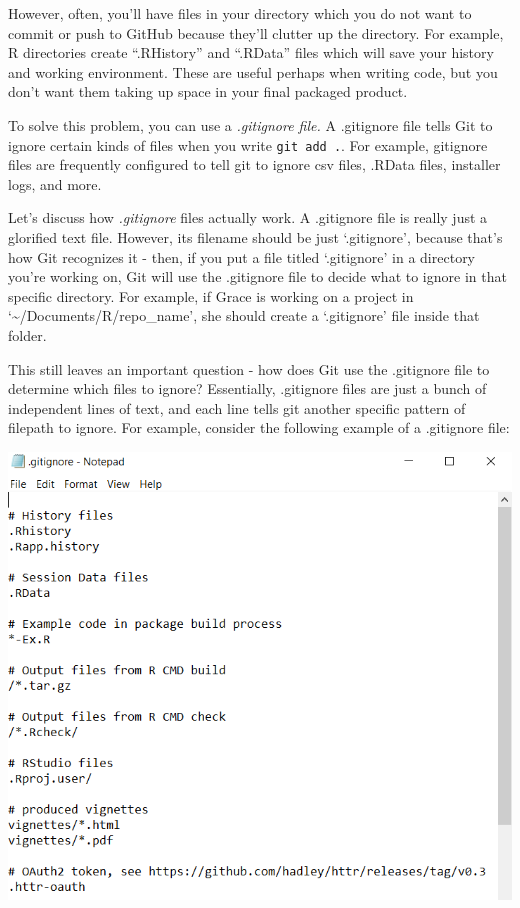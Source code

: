\documentclass[
]{book}
\newenvironment{Shaded}{\begin{snugshade}}{\end{snugshade}}
\newcommand{\NormalTok}[1]{#1}
\newcommand{\SpecialCharTok}[1]{\textcolor[rgb]{0.00,0.00,0.00}{#1}}
\newcommand{\StringTok}[1]{\textcolor[rgb]{0.31,0.60,0.02}{#1}}
\begin{document}
\begin{Shaded}
\end{Shaded}

However, often, you'll have files in your directory which you do not want to commit or push to GitHub because they'll clutter up the directory. For example, R directories create ``.RHistory'' and ``.RData'' files which will save your history and working environment. These are useful perhaps when writing code, but you don't want them taking up space in your final packaged product.

To solve this problem, you can use a \emph{.gitignore file.} A .gitignore file tells Git to ignore certain kinds of files when you write \texttt{git\ add\ .}. For example, gitignore files are frequently configured to tell git to ignore csv files, .RData files, installer logs, and more.

Let's discuss how \emph{.gitignore} files actually work. A .gitignore file is really just a glorified text file. However, its filename should be just `.gitignore', because that's how Git recognizes it - then, if you put a file titled `.gitignore' in a directory you're working on, Git will use the .gitignore file to decide what to ignore in that specific directory. For example, if Grace is working on a project in `\textasciitilde/Documents/R/repo\_name', she should create a `.gitignore' file inside that folder.

This still leaves an important question - how does Git use the .gitignore file to determine which files to ignore? Essentially, .gitignore files are just a bunch of independent lines of text, and each line tells git another specific pattern of filepath to ignore. For example, consider the following example of a .gitignore file:

\includegraphics{images/gitignore3.PNG}
\end{document}
